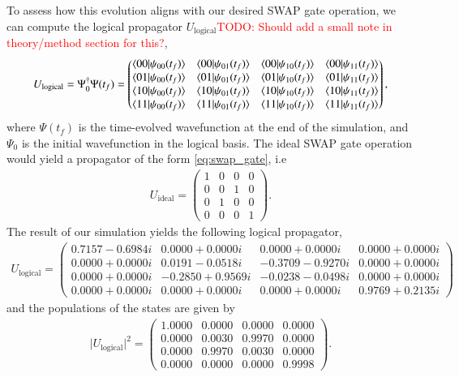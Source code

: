\documentclass{subfiles}
\begin{document}
To assess how this evolution aligns with our desired SWAP gate operation, we can compute the logical propagator $U_{\text{logical}}$\textcolor{red}{TODO: Should add a small note in theory/method section for this?},
\begin{align*}
    U_{\text{logical}} = \Psi_0^\dagger\Psi(t_f) = \begin{pmatrix}
        \braket{00|\psi_{00}(t_f)} & \braket{00|\psi_{01}(t_f)} & \braket{00|\psi_{10}(t_f)} & \braket{00|\psi_{11}(t_f)} \\
        \braket{01|\psi_{00}(t_f)} & \braket{01|\psi_{01}(t_f)} & \braket{01|\psi_{10}(t_f)} & \braket{01|\psi_{11}(t_f)} \\
        \braket{10|\psi_{00}(t_f)} & \braket{10|\psi_{01}(t_f)} & \braket{10|\psi_{10}(t_f)} & \braket{10|\psi_{11}(t_f)} \\
        \braket{11|\psi_{00}(t_f)} & \braket{11|\psi_{01}(t_f)} & \braket{11|\psi_{10}(t_f)} & \braket{11|\psi_{11}(t_f)}
    \end{pmatrix},
\end{align*}
where $\Psi(t_f)$ is the time-evolved wavefunction at the end of the simulation, and $\Psi_0$ is the initial wavefunction in the logical basis. The ideal SWAP gate operation would yield a propagator of the form \eqref{eq:swap_gate}, i.e
\begin{align*}
    U_{\text{ideal}} = \begin{pmatrix}
        1 & 0 & 0 & 0 \\
        0 & 0 & 1 & 0 \\
        0 & 1 & 0 & 0 \\
        0 & 0 & 0 & 1
    \end{pmatrix}.
\end{align*}
The result of our simulation yields the following logical propagator,
\begin{align*}
U_{\text{logical}}
=
\begin{pmatrix}
 0.7157 - 0.6984i & 0.0000 + 0.0000i & 0.0000 + 0.0000i & 0.0000 + 0.0000i \\
 0.0000 + 0.0000i & 0.0191 - 0.0518i & -0.3709 - 0.9270i & 0.0000 + 0.0000i \\
 0.0000 + 0.0000i & -0.2850 + 0.9569i & -0.0238 - 0.0498i & 0.0000 + 0.0000i \\
 0.0000 + 0.0000i & 0.0000 + 0.0000i & 0.0000 + 0.0000i & 0.9769 + 0.2135i
\end{pmatrix}
\end{align*}
and the populations of the states are given by
\begin{align*}
\lvert U_{\text{logical}}\rvert^2
=
\begin{pmatrix}
1.0000 & 0.0000 & 0.0000 & 0.0000 \\
0.0000 & 0.0030 & 0.9970 & 0.0000 \\
0.0000 & 0.9970 & 0.0030 & 0.0000 \\
0.0000 & 0.0000 & 0.0000 & 0.9998
\end{pmatrix}.
\end{align*}
\end{document}
